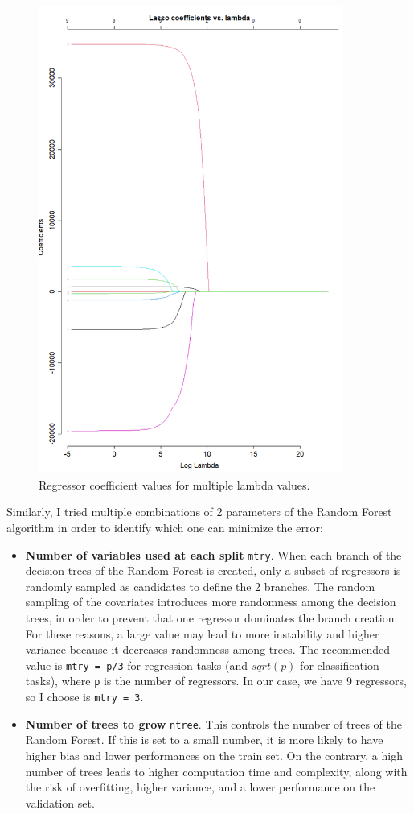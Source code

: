 \documentclass{article}
\begin{document}
	\begin{figure}[H]\centering
		\includegraphics[width=10cm]{coefficients_vs_lambda}
		\caption{Regressor coefficient values for multiple lambda values.}
		\label{fig:coefficients_vs_lambda}
	\end{figure}

	Similarly, I tried multiple combinations of 2 parameters of the Random Forest algorithm in order to identify which one can minimize the error:
	\begin{itemize}
		\item \textbf{Number of variables used at each split} \verb|mtry|. When each branch of the decision trees of the Random Forest is created, only a subset of regressors is randomly sampled as candidates to define the 2 branches. The random sampling of the covariates introduces more randomness among the decision trees, in order to prevent that one regressor dominates the branch creation. 
		For these reasons, a large value may lead to more instability and higher variance because it decreases randomness among trees.
		The recommended value is \verb|mtry = p/3| for regression tasks (and $sqrt(p)$ for classification tasks), where \verb|p| is the number of regressors. In our case, we have 9 regressors, so I choose is \verb|mtry = 3|.
		\item \textbf{Number of trees to grow} \verb|ntree|. This controls the number of trees of the Random Forest. If this is set to a small number, it is more likely to have higher bias and lower performances on the train set. On the contrary, a high number of trees leads to higher computation time and complexity, along with the risk of overfitting, higher variance, and a lower performance on the validation set.
	\end{itemize}
	
\end{document}
